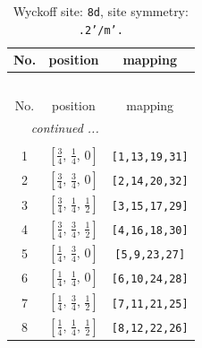 \documentclass[fleqn,8pt]{jsarticle}
\begin{document}
\begin{longtable}{ccc}
\caption{Wyckoff site: {\tt 8d}, site symmetry: {\tt .2'/m'.}}
 \\
 \hline \hline
No. & position & mapping \\ \hline \endfirsthead

\multicolumn{2}{l}{\tablename\ \thetable{}} \\
 \hline \hline
No. & position & mapping \\ \hline \endhead

 \hline \hline
\multicolumn{2}{r}{\footnotesize\it continued ...} \\ \endfoot

 \hline \hline
\multicolumn{2}{r}{} \\ \endlastfoot

1 & $\left[ \frac{3}{4},\, \frac{1}{4},\, 0 \right]$ & {\tt [1,13,19,31]} \\ \hline
2 & $\left[ \frac{3}{4},\, \frac{3}{4},\, 0 \right]$ & {\tt [2,14,20,32]} \\ \hline
3 & $\left[ \frac{3}{4},\, \frac{1}{4},\, \frac{1}{2} \right]$ & {\tt [3,15,17,29]} \\ \hline
4 & $\left[ \frac{3}{4},\, \frac{3}{4},\, \frac{1}{2} \right]$ & {\tt [4,16,18,30]} \\ \hline
5 & $\left[ \frac{1}{4},\, \frac{3}{4},\, 0 \right]$ & {\tt [5,9,23,27]} \\ \hline
6 & $\left[ \frac{1}{4},\, \frac{1}{4},\, 0 \right]$ & {\tt [6,10,24,28]} \\ \hline
7 & $\left[ \frac{1}{4},\, \frac{3}{4},\, \frac{1}{2} \right]$ & {\tt [7,11,21,25]} \\ \hline
8 & $\left[ \frac{1}{4},\, \frac{1}{4},\, \frac{1}{2} \right]$ & {\tt [8,12,22,26]} \\
\end{longtable}
\renewcommand{\arraystretch}{1.2}
\end{document}
